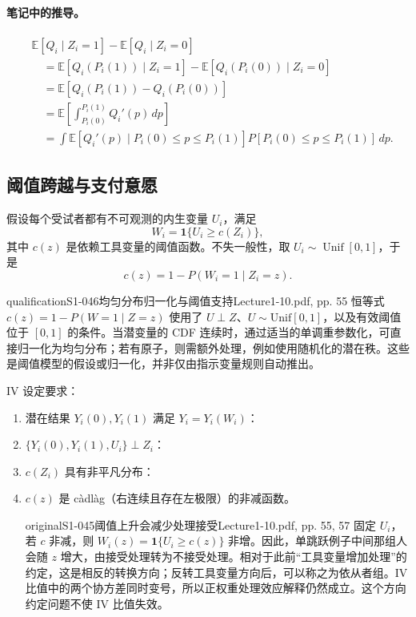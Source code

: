 \paragraph{笔记中的推导。}
\begin{align*}
 &\mathbb E[Q_i\mid Z_i=1]-\mathbb E[Q_i\mid Z_i=0]\\
 &\quad=\mathbb E[Q_i(P_i(1))\mid Z_i=1]
 -\mathbb E[Q_i(P_i(0))\mid Z_i=0]\\
 &\quad=\mathbb E[Q_i(P_i(1))-Q_i(P_i(0))]\\
 &\quad=\mathbb E\left[\int_{P_i(0)}^{P_i(1)}Q_i'(p)\,dp\right]\\
 &\quad=\int\mathbb E[Q_i'(p)\mid P_i(0)\le p\le P_i(1)]
 P[P_i(0)\le p\le P_i(1)]\,dp.
\end{align*}

\subsection{阈值跨越与支付意愿}
假设每个受试者都有不可观测的内生变量 $U_i$，满足
\[
 W_i=\mathbf1\{U_i\ge c(Z_i)\},
\]
其中 $c(z)$ 是依赖工具变量的阈值函数。不失一般性，取 $U_i\sim\operatorname{Unif}[0,1]$，于是
\[
 c(z)=1-P(W_i=1\mid Z_i=z).
\]
\begin{reviewnote}{qualification}{S1-046}{均匀分布归一化与阈值支持}{Lecture1-10.pdf, pp. 55}
恒等式 $c(z)=1-P(W=1\mid Z=z)$ 使用了 $U\perp Z$、$U\sim\mathrm{Unif}[0,1]$，以及有效阈值位于 $[0,1]$ 的条件。当潜变量的 CDF 连续时，通过适当的单调重参数化，可直接归一化为均匀分布；若有原子，则需额外处理，例如使用随机化的潜在秩。这些是阈值模型的假设或归一化，并非仅由指示变量规则自动推出。
\end{reviewnote}

IV 设定要求：
\begin{enumerate}
 \item 潜在结果 $Y_i(0),Y_i(1)$ 满足 $Y_i=Y_i(W_i)$：
 \item $\{Y_i(0),Y_i(1),U_i\}\perp Z_i$：
 \item $c(Z_i)$ 具有非平凡分布：
 \item $c(z)$ 是 càdlàg（右连续且存在左极限）的非减函数。
\begin{reviewnote}{original}{S1-045}{阈值上升会减少处理接受}{Lecture1-10.pdf, pp. 55, 57}
固定 $U_i$，若 $c$ 非减，则 $W_i(z)=\mathbf1\{U_i\ge c(z)\}$ 非增。因此，单跳跃例子中间那组人会随 $z$ 增大，由接受处理转为不接受处理。相对于此前“工具变量增加处理”的约定，这是相反的转换方向；反转工具变量方向后，可以称之为依从者组。IV 比值中的两个协方差同时变号，所以正权重处理效应解释仍然成立。这个方向约定问题不使 IV 比值失效。
\end{reviewnote}

\end{enumerate}



